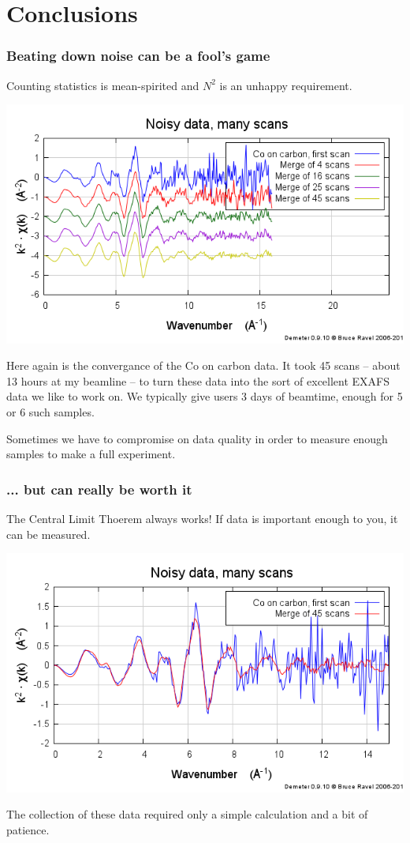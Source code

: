 \documentclass[10pt, xcolor=x11names, compress]{beamer}
\begin{document}
\section{Conclusions}

\begin{frame}
  \frametitle{Beating down noise can be a fool's game}
  \small%
  \begin{center}
    \alert{Counting statistics is mean-spirited and $N^2$ is an
      unhappy requirement.}
  \end{center}

  \begin{center}
    \includegraphics[width=0.55\linewidth]{images/CoGr.png}
  \end{center}

  Here again is the convergance of the Co on carbon data.
  It took 45 scans -- about 13 hours at my beamline -- to turn these
  data into the sort of excellent EXAFS data we like to work on.  We
  typically give users 3 days of beamtime, enough for 5 or 6 such
  samples.

  \bigskip

  \begin{alertblock}{}
    Sometimes we have to compromise on data quality in order to
    measure enough samples to make a full experiment.
  \end{alertblock}
\end{frame}

\begin{frame}
  \frametitle{... but can really be worth it}

  \begin{exampleblock}{}
    The Central Limit Thoerem always works!  If data is important
    enough to you, it can be measured.
  \end{exampleblock}

  \begin{center}
    \includegraphics[width=0.55\linewidth]{images/merge_chik.png}

    \bigskip

    The collection of these data required only a simple calculation and
    a bit of patience.
  \end{center}
\end{frame}
\end{document}
